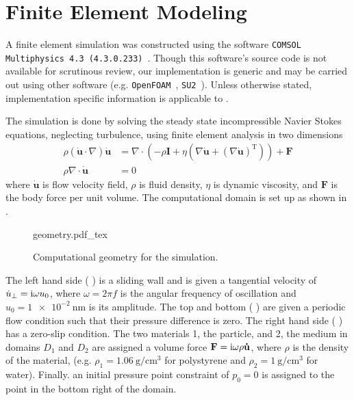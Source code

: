 \section{Finite Element Modeling}
A finite element simulation was constructed using the software
\texttt{COMSOL Multiphysics 4.3 (4.3.0.233)}~\cite{multiphysics1994comsol}.
Though this software's source code is not available for
scrutinous review, our implementation is generic and may be carried out
using other software (e.g. \texttt{OpenFOAM}~\cite{jasak2007openfoam},
\texttt{SU2}~\cite{palacios2013stanford}).  Unless otherwise stated,
implementation specific information is applicable to \comsol.

The simulation is done by solving the steady state incompressible Navier
Stokes equations, neglecting turbulence, using finite element analysis in
two dimensions
\begin{align}
 \rho\left(\mathbf{\dot{u}}\cdot \nabla\right)\mathbf{\dot{u}}
 &=\nabla \cdot \left( -\rho \mathbf{I} + \eta \left(\nabla \mathbf{\dot{u}} +
 \left( \nabla \mathbf{\dot{u}}\right)^\mathrm{T}\right)\right) + \mathbf{F}\\
 \rho \nabla \cdot \mathbf{\dot{u}} &= 0
\end{align}
where $\mathbf{\dot{u}}$ is flow velocity field, $\rho$ is fluid density,
$\eta$ is dynamic viscosity, and $\mathbf{F}$ is the body force per unit
volume.  The computational domain is set up as shown in
.  
\begin{figure}[h]
 \centering
 {geometry.pdf_tex}
 \caption{Computational geometry for the simulation.}
 \label{fig:compgeometry}
\end{figure}

The left hand side (
) %
is a sliding wall and is given a tangential velocity of $\dot{u}_\perp = {\mathrm{i}}
\omega u_0$, where $\omega=2\pi f$ is the angular frequency of oscillation
and $u_0=\SI{1e-2}{\nano\meter}$ is its amplitude.  The top and bottom
(%
%
) are given a periodic flow condition such that their pressure difference
is zero.  The right hand side (
) %
has a zero-slip condition.  The two materials 1, the particle, and 2, the
medium in domains $D_1$ and $D_2$ are assigned a volume force $\mathbf{F}={\mathrm{i}} \omega \rho
\mathbf{\dot{u}}$,
where $\rho$ is the density of the material, (e.g. $\rho_1 =
\SI{1.06}{\gram\per\centi\meter\cubed}$ for polystyrene and $\rho_2 =
\SI{1}{\gram\per\centi\meter\cubed}$ for water).  Finally. an initial pressure point
constraint of $p_0=0$ is assigned to the point in the bottom right of the
domain.  

